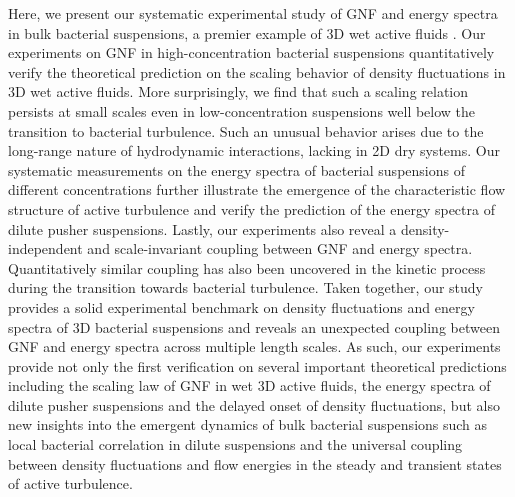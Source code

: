 \documentclass[twocolumn,aps,prx,amsmath,amssymb,longbibliography]{revtex4-2}
\begin{document}
Here, we present our systematic experimental study of GNF and energy spectra in bulk bacterial suspensions, a premier example of 3D wet active fluids \cite{Marchetti2013}. Our experiments on GNF in high-concentration bacterial suspensions quantitatively verify the theoretical prediction on the scaling behavior of density fluctuations in 3D wet active fluids. More surprisingly, we find that such a scaling relation persists at small scales even in low-concentration suspensions well below the transition to bacterial turbulence. Such an unusual behavior arises due to the long-range nature of hydrodynamic interactions, lacking in 2D dry systems. Our systematic measurements on the energy spectra of bacterial suspensions of different concentrations further illustrate the emergence of the characteristic flow structure of active turbulence and verify the prediction of the energy spectra of dilute pusher suspensions. Lastly, our experiments also reveal a density-independent and scale-invariant coupling between GNF and energy spectra. Quantitatively similar coupling has also been uncovered in the kinetic process during the transition towards bacterial turbulence. Taken together, our study provides a solid experimental benchmark on density fluctuations and energy spectra of 3D bacterial suspensions and reveals an unexpected coupling between GNF and energy spectra across multiple length scales. As such, our experiments provide not only the first verification on several important theoretical predictions including the scaling law of GNF in wet 3D active fluids, the energy spectra of dilute pusher suspensions and the delayed onset of density fluctuations, but also new insights into the emergent dynamics of bulk bacterial suspensions such as local bacterial correlation in dilute suspensions and the universal coupling between density fluctuations and flow energies in the steady and transient states of active turbulence.
\end{document}
